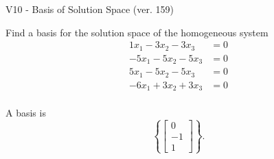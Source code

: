 \begin{exercise}
  \begin{exerciseTitle}V10 - Basis of Solution Space (ver. 159)\end{exerciseTitle}
  \begin{exerciseStatement}
    Find a basis for the solution space of the homogeneous system 
\begin{align*}
 1 x_ 1 -3 x_ 2 -3 x_ 3 &= 0  \\ 
  -5 x_ 1 -5 x_ 2 -5 x_ 3 &= 0  \\ 
  5 x_ 1 -5 x_ 2 -5 x_ 3 &= 0  \\ 
  -6 x_ 1 + 3 x_ 2 + 3 x_ 3 &= 0  \\ 
 \end{align*}


 
  \end{exerciseStatement}

  \begin{exerciseAnswer}
   A basis is   
\[\left\{\left[\begin{array}{c}
0 \\
-1 \\
1
\end{array}\right]\right\}.\]

  


  \end{exerciseAnswer}
\end{exercise}
